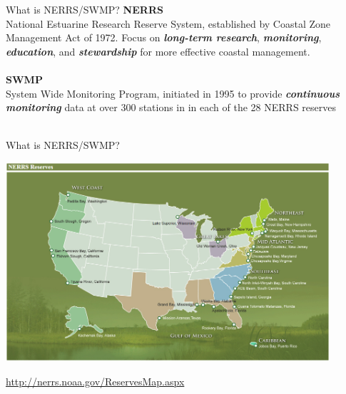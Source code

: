 \documentclass[serif]{beamer}\usepackage[]{graphicx}\usepackage[]{color}
\newcommand{\Bigtxt}[1]{\textbf{\textit{#1}}}
\begin{document}
\begin{frame}{What is NERRS/SWMP?}{}
{\bf NERRS}\\
National Estuarine Research Reserve System, established by Coastal Zone Management Act of 1972. Focus on \Bigtxt{long-term research}, \Bigtxt{monitoring}, \Bigtxt{education}, and \Bigtxt{stewardship} for more effective coastal management.\\~\\
{\bf SWMP}\\
System Wide Monitoring Program, initiated in 1995 to provide \Bigtxt{continuous monitoring} data at over 300 stations in in each of the 28 NERRS reserves \\~\\
\end{frame}

\begin{frame}{What is NERRS/SWMP?}
\centerline{\includegraphics[width = 0.9\textwidth]{fig/NERRS_locations.png}}
\tiny
\flushright
\href{http://nerrs.noaa.gov/ReservesMap.aspx}{http://nerrs.noaa.gov/ReservesMap.aspx}
\end{frame}
\end{document}
